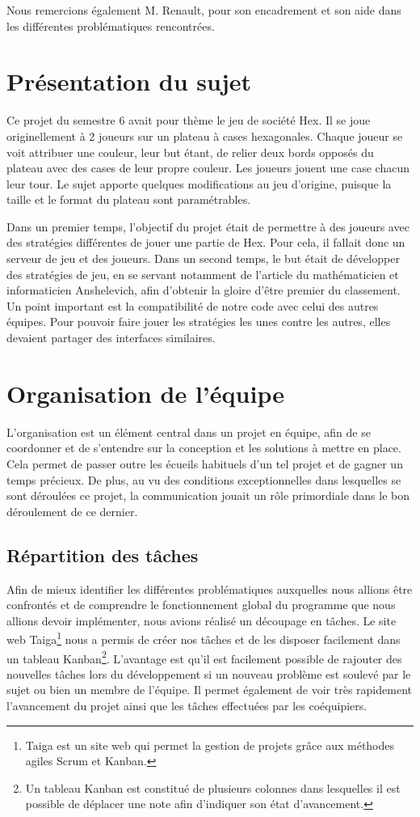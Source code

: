 \documentclass[a4paper, 12pt]{article}
\begin{document}
Nous remercions également M. Renault, pour son encadrement et son aide dans les différentes problématiques rencontrées.
\newpage
\tableofcontents
\setcounter{page}{1}
\newpage

\section{Présentation du sujet}
Ce projet du semestre 6 avait pour thème le jeu de société Hex. Il se joue originellement à 2 joueurs sur un plateau à cases hexagonales. Chaque joueur se voit attribuer une couleur, leur but étant, de relier deux bords opposés du plateau avec des cases de leur propre couleur. Les joueurs jouent une case chacun leur tour. Le sujet apporte quelques modifications au jeu d'origine, puisque la taille et le format du plateau sont paramétrables.

Dans un premier temps, l'objectif du projet était de permettre à des joueurs avec des stratégies différentes de jouer une partie de Hex. Pour cela, il fallait donc un serveur de jeu et des joueurs. Dans un second temps, le but était de développer des stratégies de jeu, en se servant notamment de l'article du mathématicien et informaticien Anshelevich, afin d'obtenir la gloire d'être premier du classement. Un point important est la compatibilité de notre code avec celui des autres équipes. Pour pouvoir faire jouer les stratégies les unes contre les autres, elles devaient partager des interfaces similaires.

\section{Organisation de l'équipe}
L'organisation est un élément central dans un projet en équipe, afin de se coordonner et de s'entendre sur la conception et les solutions à mettre en place. Cela permet de passer outre les écueils habituels d'un tel projet et de gagner un temps précieux. De plus, au vu des conditions exceptionnelles dans lesquelles se sont déroulées ce projet, la communication jouait un rôle primordiale dans le bon déroulement de ce dernier.

\subsection{Répartition des tâches}
Afin de mieux identifier les différentes problématiques auxquelles nous allions être confrontés et de comprendre le fonctionnement global du programme que nous allions devoir implémenter, nous avions réalisé un découpage en tâches. Le site web Taiga\footnote{Taiga est un site web qui permet la gestion de projets grâce aux méthodes agiles Scrum et Kanban.} nous a permis de créer nos tâches et de les disposer facilement dans un tableau Kanban\footnote{Un tableau Kanban est constitué de plusieurs colonnes dans lesquelles il est possible de déplacer une note afin d'indiquer son état d'avancement.}. L'avantage est qu'il est facilement possible de rajouter des nouvelles tâches lors du développement si un nouveau problème est soulevé par le sujet ou bien un membre de l'équipe. Il permet également de voir très rapidement l'avancement du projet ainsi que les tâches effectuées par les coéquipiers.
\end{document}
